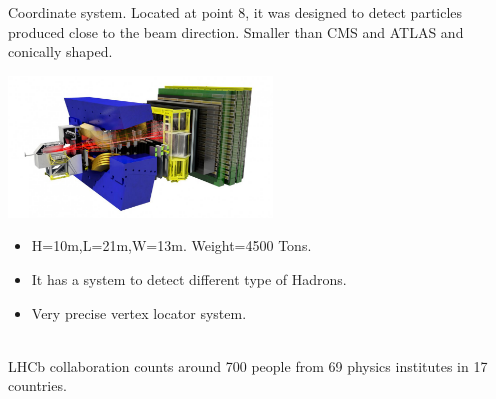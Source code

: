 \documentclass[8pt]{beamer}
\begin{document}
\begin{frame}[fragile]{Coordinate system.}
	Located at point 8, it was designed to detect particles produced close to the beam direction.
	Smaller than CMS and ATLAS and conically shaped.
	
	\vspace{0.5cm}
	\begin{minipage}{0.7\textwidth}%
		\includegraphics[width=7cm]{8}
	\end{minipage}%
	\hfill%
	\begin{minipage}{0.3\textwidth}\raggedleft
		\begin{itemize}
			\item H=10m,L=21m,W=13m. Weight=4500 Tons.		
			\item It has a system to detect different type of Hadrons.
			\item Very precise vertex locator system.
			
		\end{itemize}
	\end{minipage}
	\\
	\vspace{0.5cm}
	LHCb collaboration counts around 700 people from 69 physics institutes in 17 countries.
\end{frame}

\end{document}
